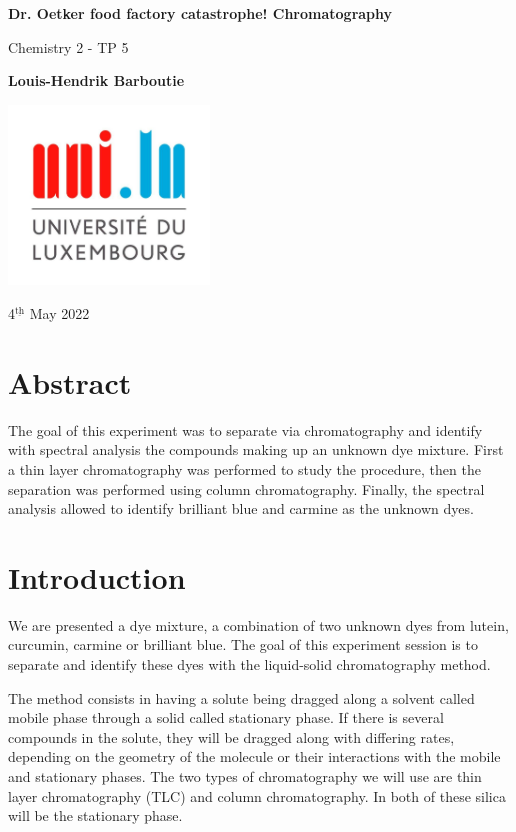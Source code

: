 \documentclass{article}
\begin{document}
\begin{titlepage}
    \begin{center}
        \vspace*{1cm}
        \Huge
        \textbf{Dr. Oetker food factory catastrophe! Chromatography}
        
        \vspace{0.5cm}
        \LARGE
        Chemistry 2 - TP 5
        
        \vspace{1.5cm}
        \textbf{Louis-Hendrik Barboutie}
        
        \vfill

        \includegraphics[width=0.4\textwidth]{logo_uni.jpg}
        
        \Large
        4$^{\underline{\text{th}}}$ May 2022
    \end{center}
\end{titlepage}

\section{Abstract}
The goal of this experiment was to separate via chromatography and identify with spectral analysis the compounds making up an unknown dye mixture. First a thin layer chromatography was performed to study the procedure, then the separation was performed using column chromatography. Finally, the spectral analysis allowed to identify brilliant blue and carmine as the unknown dyes.

\section{Introduction}
We are presented a dye mixture, a combination of two unknown dyes from lutein, curcumin, carmine or brilliant blue. The goal of this experiment session is to separate and identify these dyes with the liquid-solid chromatography method.

The method consists in having a solute being dragged along a solvent called mobile phase through a solid called stationary phase. If there is several compounds in the solute, they will be dragged along with differing rates, depending on the geometry of the molecule or their interactions with the mobile and stationary phases. The two types of chromatography we will use are thin layer chromatography (TLC) and column chromatography. In both of these silica will be the stationary phase. 
\end{document}
